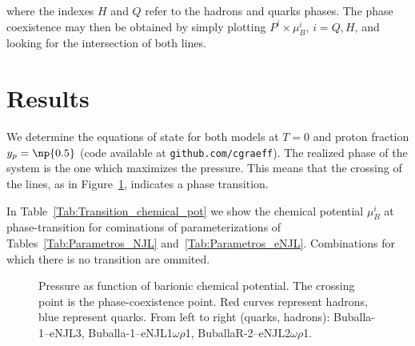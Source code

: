 \documentclass[plainsections,alongposter]{sciposterlocal}
\begin{document}
\begin{multicols}{2}
\noindent{}where the indexes $H$ and $Q$ refer to the hadrons and quarks phases. The phase coexistence may then be obtained by simply plotting $P^i \times \mu_B^i$, $i = Q, H$, and looking for the intersection of both lines.

\section*{Results}

We determine the equations of state for both models at $T = 0$ and proton fraction $y_p = \np{0.5}$ (code available at \texttt{github.com/cgraeff}). The realized phase of the system is the one which maximizes the pressure. This means that the crossing of the lines, as in Figure~\ref{Fig:Pressure_func_chemical_pot}, indicates a phase transition.

In Table~\ref{Tab:Transition_chemical_pot} we show the chemical potential $\mu_B^i$ at phase-transition for cominations of parameterizations of Tables~\ref{Tab:Parametros_NJL} and~\ref{Tab:Parametros_eNJL}. Combinations for which there is no transition are ommited.

\begin{figure}
\caption{Pressure as function of barionic chemical potential. The crossing point is the phase-coexistence point. Red curves represent hadrons, blue represent quarks. From left to right (quarks, hadrons): Buballa-1--eNJL3, Buballa-1--eNJL1$\omega\rho$1, BuballaR-2--eNJL2$\omega\rho$1.\label{Fig:Pressure_func_chemical_pot}}

\end{figure}


\end{multicols}
\end{document}
